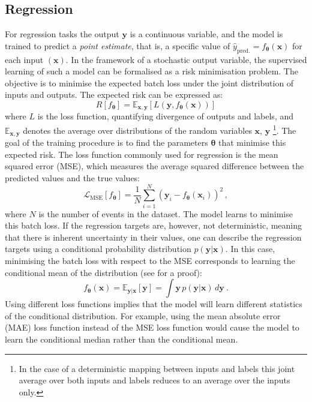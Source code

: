 \subsection{Regression}
For regression tasks the output $\mathbf{y}$ is a continuous variable, and the model is trained to predict a \textit{point estimate}, that is, a specific value of $\hat y_{\text{pred.}}=f_{\boldsymbol{\theta}}(\mathbf{x})$ for each input $(\mathbf{x})$. In the framework of a stochastic output variable, the supervised learning of such a model can be formalised as a risk minimisation problem. The objective is to minimise the expected batch loss under the joint distribution of inputs and outputs. The expected risk can be expressed as:
\begin{equation}
    R[f_{\boldsymbol{\theta}}] = \mathbb{E}_{\mathbf{x}, \mathbf{y}}[L(\mathbf{y},f_{\boldsymbol{\theta}}(\mathbf{x}))]
\end{equation}
where $L$ is the loss function, quantifying divergence of outputs and labels, and $\mathbb{E}_{\mathbf{x}, \mathbf{y}}$ denotes the average over distributions of the random variables $\mathbf{x}$, $\mathbf{y}$ \footnote{In the case of a deterministic mapping between inputs and labels this joint average over both inputs and labels reduces to an average over the inputs only.}. The goal of the training procedure is to find the parameters ${\boldsymbol{\theta}}$ that minimise this expected risk.
The loss function commonly used for regression is the mean squared error (MSE), which measures the average squared difference between the predicted values and the true values:
\begin{equation}
    \mathcal{L}_{\text{MSE}}[f_{\boldsymbol{\theta}}] = \frac{1}{N}\sum_{i=1}^{N} (\mathbf{y}_i - f_{\boldsymbol{\theta}}(\mathbf{x}_i))^2\,,
\end{equation}
where $N$ is the number of events in the dataset. The model learns to minimise this batch loss. If the regression targets are, however, not deterministic, meaning that there is inherent uncertainty in their values, one can describe the regression targets using a conditional probability distribution $p(\mathbf{y}|\mathbf{x})$. In this case, minimising the batch loss with respect to the MSE corresponds to learning the conditional mean of the distribution (see  for a proof):
\begin{equation}
    f_{\boldsymbol{\theta}}(\mathbf{x}) = \mathbb{E}_{\mathbf{y}|\mathbf{x}}[\mathbf{y}] = \int\mathbf{y} \,p(\mathbf{y}|\mathbf{x})\, d\mathbf{y}~.
\end{equation}
Using different loss functions implies that the model will learn different statistics of the conditional distribution. For example, using the mean absolute error (MAE) loss function instead of the MSE loss function would cause the model to learn the conditional median rather than the conditional mean.

